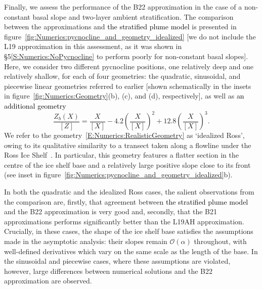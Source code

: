 \documentclass[openacc]{rsproca_new}%
\newcommand{\order}[1]{\mathcal{O}(#1)}
\newcommand{\red}[1]{{\color{red} #1}}
\newcommand{\blue}[1]{{\color{blue} #1}}
\newcommand{\rout}[1]{\red{\st{#1}}}\newcommand{\ab}[1]{\textcolor{Green}{#1}}\newcommand{\about}[1]{\textcolor{Cyan}{\sout{#1}}}
\renewcommand{\rout}[1]{{}} %
\renewcommand{\blue}[1]{{\textcolor{black}{#1}}} %
\renewcommand{\red}[1]{{}} %
\begin{document}
Finally, we assess the performance of the B22 approximation in the case of a non-constant basal slope and two-layer ambient stratification. The comparison between the approximations and \blue{the stratified plume model} \rout{numerical solutions} is presented in figure~\ref{fig:Numerics:pycnocline_and_geometry_idealized} [we do not include the L19 approximation in this assessment, as it was shown in \S5\ref{S:Numerics:NoPycnocline} to perform poorly for non-constant basal slopes]. Here, we consider two different pycnocline positions, one relatively deep and one relatively shallow, for each of four geometries: the quadratic, sinusoidal, and piecewise linear geometries referred to earlier [shown schematically in the insets in figure~\ref{fig:Numerics:Geometry}(b), (c), and (d), respectively], as well as \rout{a fourth geometry} \blue{an additional geometry} 
\begin{equation}\label{E:Numerics:RealisticGeometry}
\frac{Z_b(X)}{\left[Z\right]}= \frac{X}{\left[X\right]} -4.2\left(\frac{X}{\left[X\right]}\right)^2 + 12.8\left(\frac{X}{\left[X\right]}\right)^3.
\end{equation}
We refer to the geometry~\eqref{E:Numerics:RealisticGeometry} as `idealized Ross', owing to its qualitative similarity to a transect taken along a flowline under the Ross Ice Shelf~\cite{Shabtaie1987JGeophysResSolidEarth}. In particular, this geometry features a flatter section in the centre of the ice shelf base and a relatively large positive slope close to its front (see inset in figure~\ref{fig:Numerics:pycnocline_and_geometry_idealized}b).

In both the quadratic and the idealized Ross cases, the salient observations from the comparison are, firstly, that agreement between \rout{numerical solutions}\blue{the stratified plume model} and the B22 approximation is very good and, secondly, that the B21 approximations performs significantly better than the L19AH approximation. Crucially, in these cases, the shape of the ice shelf base satisfies the assumptions made in the asymptotic analysis: their slopes remain $\order{\alpha}$ throughout, with well-defined derivatives which vary on the same scale as the length of the base. In the sinusoidal and piecewise cases, where these assumptions are violated, however, large differences between numerical solutions and the B22 approximation are observed.
\end{document}
